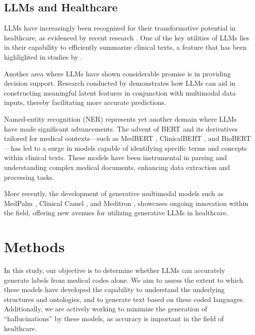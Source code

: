 \documentclass[11pt]{article}
\theoremstyle{plain}
\theoremstyle{definition}
\theoremstyle{remark}
\begin{document}
\subsection{LLMs and Healthcare}

LLMs have increasingly been recognized for their transformative potential in healthcare, as evidenced by recent research \citep{karabacak2023embracing}. One of the key utilities of LLMs lies in their capability to efficiently summarize clinical texts, a feature that has been highlighted in studies by \citep{van2023clinical, van2024adapted}. 

Another area where LLMs have shown considerable promise is in providing decision support. Research conducted by \citep{chen2024multimodal, belyaeva2023multimodal} demonstrates how LLMs can aid in constructing meaningful latent features in conjunction with multimodal data inputs, thereby facilitating more accurate predictions. 

Named-entity recognition (NER) represents yet another domain where LLMs have made significant advancements. The advent of BERT and its derivatives tailored for medical contexts—such as MedBERT \citep{liu2021med}, ClinicalBERT \citep{huang2019clinicalbert, mulyar2021mt}, and BioBERT \citep{lee2020biobert, shin2020biomegatron}—has led to a surge in models capable of identifying specific terms and concepts within clinical texts. These models have been instrumental in parsing and understanding complex medical documents, enhancing data extraction and processing tasks. 

More recently, the development of generative multimodal models such as MedPalm \citep{tu2024towards}, Clinical Camel \citep{toma2023clinical}, and Meditron \citep{chen2023meditron70b}, showcases ongoing innovation within the field, offering new avenues for utilizing generative LLMs in healthcare.

\section{Methods}
In this study, our objective is to determine whether LLMs can accurately generate labels from medical codes alone. We aim to assess the extent to which these models have developed the capability to understand the underlying structures and ontologies, and to generate text based on these coded languages. Additionally, we are actively working to minimize the generation of ``hallucinations'' by these models, as accuracy is important in the field of healthcare.
\end{document}
